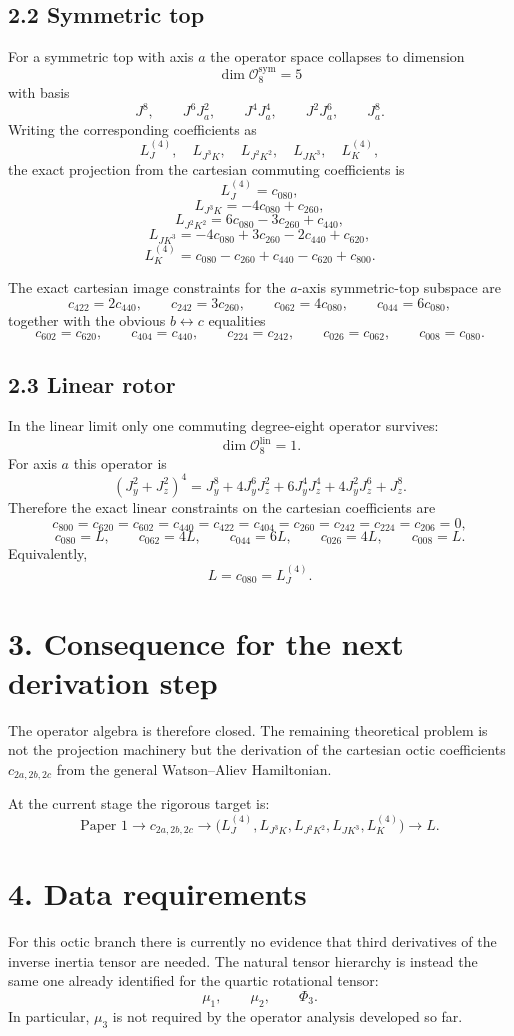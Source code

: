\documentclass[11pt]{article}
\begin{document}
\subsection*{2.2 Symmetric top}
For a symmetric top with axis $a$ the operator space collapses to dimension
\[
\dim \mathcal O_8^{\mathrm{sym}} = 5
\]
with basis
\[
J^8,\qquad J^6J_a^2,\qquad J^4J_a^4,\qquad J^2J_a^6,\qquad J_a^8.
\]
Writing the corresponding coefficients as
\[
L_J^{(4)},\quad L_{J^3K},\quad L_{J^2K^2},\quad L_{JK^3},\quad L_K^{(4)},
\]
the exact projection from the cartesian commuting coefficients is
\[
L_J^{(4)}=c_{080},
\]
\[
L_{J^3K}=-4c_{080}+c_{260},
\]
\[
L_{J^2K^2}=6c_{080}-3c_{260}+c_{440},
\]
\[
L_{JK^3}=-4c_{080}+3c_{260}-2c_{440}+c_{620},
\]
\[
L_K^{(4)}=c_{080}-c_{260}+c_{440}-c_{620}+c_{800}.
\]

The exact cartesian image constraints for the $a$-axis symmetric-top subspace
are
\[
c_{422}=2c_{440},\qquad
c_{242}=3c_{260},\qquad
c_{062}=4c_{080},\qquad
c_{044}=6c_{080},
\]
together with the obvious $b\leftrightarrow c$ equalities
\[
c_{602}=c_{620},\qquad
c_{404}=c_{440},\qquad
c_{224}=c_{242},\qquad
c_{026}=c_{062},\qquad
c_{008}=c_{080}.
\]

\subsection*{2.3 Linear rotor}
In the linear limit only one commuting degree-eight operator survives:
\[
\dim \mathcal O_8^{\mathrm{lin}} = 1.
\]
For axis $a$ this operator is
\[
(J_y^2+J_z^2)^4
=
J_y^8+4J_y^6J_z^2+6J_y^4J_z^4+4J_y^2J_z^6+J_z^8.
\]
Therefore the exact linear constraints on the cartesian coefficients are
\[
c_{800}=c_{620}=c_{602}=c_{440}=c_{422}=c_{404}=c_{260}=c_{242}=c_{224}=c_{206}=0,
\]
\[
c_{080}=L,\qquad
c_{062}=4L,\qquad
c_{044}=6L,\qquad
c_{026}=4L,\qquad
c_{008}=L.
\]
Equivalently,
\[
L = c_{080} = L_J^{(4)}.
\]

\section*{3. Consequence for the next derivation step}
The operator algebra is therefore closed. The remaining theoretical problem is
not the projection machinery but the derivation of the cartesian octic
coefficients $c_{2a,2b,2c}$ from the general Watson--Aliev Hamiltonian.

At the current stage the rigorous target is:
\[
\text{Paper 1} \longrightarrow c_{2a,2b,2c} \longrightarrow
\bigl(L_J^{(4)},L_{J^3K},L_{J^2K^2},L_{JK^3},L_K^{(4)}\bigr)
\longrightarrow L.
\]

\section*{4. Data requirements}
For this octic branch there is currently no evidence that third derivatives of
the inverse inertia tensor are needed. The natural tensor hierarchy is instead
the same one already identified for the quartic rotational tensor:
\[
\mu_1,\qquad \mu_2,\qquad \Phi_3.
\]
In particular, $\mu_3$ is not required by the operator analysis developed so
far.
\end{document}
